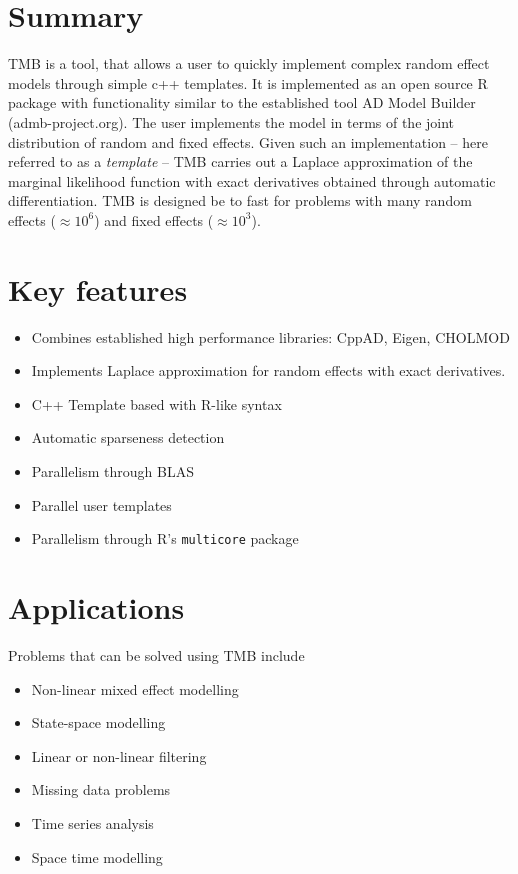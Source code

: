 \documentclass[largefonts]{sciposter}
\begin{document}
\begin{multicols}{3}



\section*{Summary}
TMB is a tool, that allows a user to quickly implement complex random
effect models through simple c++ templates. It is implemented as an
open source R package with functionality similar to the established tool AD Model Builder
(admb-project.org). The user implements the model in terms of the
joint distribution of random and fixed effects. Given such an
implementation -- here referred to as a \emph{template} -- TMB carries
out a Laplace approximation of the marginal likelihood function with
exact derivatives obtained through automatic differentiation. TMB is
designed be to fast for problems with many random effects
($\approx 10^6$) and fixed effects ($\approx 10^3$).

\section{Key features}
\begin{itemize}
  \item Combines established high performance libraries: CppAD, Eigen, CHOLMOD
  \item Implements Laplace approximation for random effects with exact derivatives.
  \item C++ Template based with R-like syntax
  \item Automatic sparseness detection
  \item Parallelism through BLAS
  \item Parallel user templates
  \item Parallelism through R's \texttt{multicore} package 
\end{itemize}

\section{Applications}
Problems that can be solved using TMB include
\begin{itemize}
\item Non-linear mixed effect modelling
\item State-space modelling
\item Linear or non-linear filtering
\item Missing data problems
\item Time series analysis
\item Space time modelling


\end{itemize}
\end{multicols}
\end{document}
